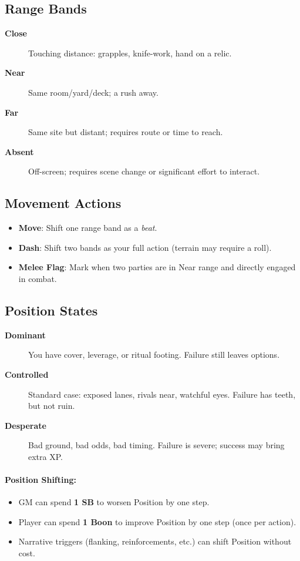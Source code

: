 \subsection*{Range Bands}
\begin{description}
\item[\textbf{Close}]  Touching distance: grapples, knife-work, hand on a relic.
\item[\textbf{Near}]  Same room/yard/deck; a rush away.
\item[\textbf{Far}]  Same site but distant; requires route or time to reach.
\item[\textbf{Absent}]  Off-screen; requires scene change or significant effort to interact.
\end{description}

\subsection*{Movement Actions}
\label{sec:movement-actions}
\begin{itemize}
\item \textbf{Move}: Shift one range band as a \emph{beat}.
\item \textbf{Dash}: Shift two bands as your full action (terrain may require a roll).
\item \textbf{Melee Flag}: Mark when two parties are in Near range and directly engaged in combat.
\end{itemize}

\subsection*{Position States}
\begin{description}
\item[\textbf{Dominant}]  You have cover, leverage, or ritual footing. Failure still leaves options.
\item[\textbf{Controlled}]  Standard case: exposed lanes, rivals near, watchful eyes. Failure has teeth, but not ruin.
\item[\textbf{Desperate}]  Bad ground, bad odds, bad timing. Failure is severe; success may bring extra XP.
\end{description}

\paragraph{Position Shifting:}
\begin{itemize}
\item GM can spend \textbf{1 SB} to worsen Position by one step.
\item Player can spend \textbf{1 Boon} to improve Position by one step (once per action).
\item Narrative triggers (flanking, reinforcements, etc.) can shift Position without cost.
\end{itemize}


